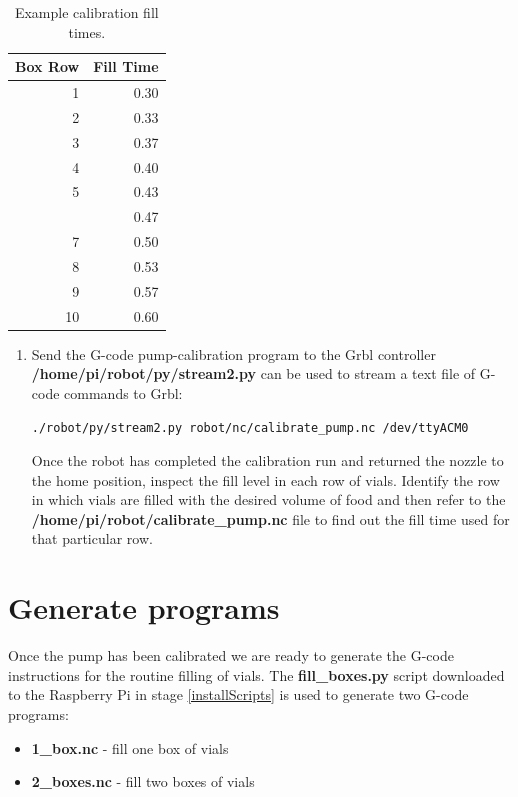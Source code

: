 \documentclass[]{book}
\providecommand{\tightlist}{%
  \setlength{\itemsep}{0pt}\setlength{\parskip}{0pt}}
\theoremstyle{definition}
\theoremstyle{definition}
\theoremstyle{definition}
\theoremstyle{remark}
\begin{document}
\begin{table}

\caption{\label{tab:calibrationFillTimes}Example calibration fill times.}
\centering
\begin{tabular}[t]{rr}
\toprule
Box Row & Fill Time\\
\midrule
1 & 0.30\\
2 & 0.33\\
3 & 0.37\\
4 & 0.40\\
5 & 0.43\\
\addlinespace
6 & 0.47\\
7 & 0.50\\
8 & 0.53\\
9 & 0.57\\
10 & 0.60\\
\bottomrule
\end{tabular}
\end{table}

\begin{enumerate}
\def\labelenumi{\arabic{enumi}.}
\setcounter{enumi}{3}
\item
  Send the G-code pump-calibration program to the Grbl controller
  \textbf{/home/pi/robot/py/stream2.py} can be used to stream a text
  file of G-code commands to Grbl:

\begin{verbatim}
./robot/py/stream2.py robot/nc/calibrate_pump.nc /dev/ttyACM0
\end{verbatim}

  Once the robot has completed the calibration run and returned the
  nozzle to the home position, inspect the fill level in each row of
  vials. Identify the row in which vials are filled with the desired
  volume of food and then refer to the
  \textbf{/home/pi/robot/calibrate\_pump.nc} file to find out the fill
  time used for that particular row.
\end{enumerate}

\section{Generate programs}\label{generate-programs}

Once the pump has been calibrated we are ready to generate the G-code
instructions for the routine filling of vials. The
\textbf{fill\_boxes.py} script downloaded to the Raspberry Pi in stage
\ref{installScripts} is used to generate two G-code programs:

\begin{itemize}
\tightlist
\item
  \textbf{1\_box.nc} - fill one box of vials
\item
  \textbf{2\_boxes.nc} - fill two boxes of vials
\end{itemize}
\end{document}
